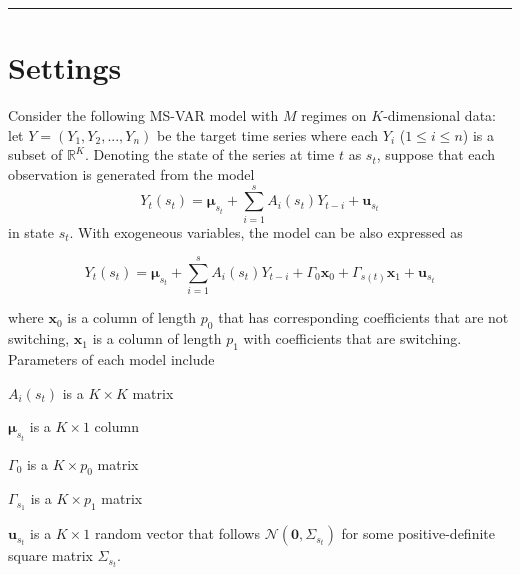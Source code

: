 \documentclass[11pt]{article}
\newcommand{\R}{\mathbb{R}}
\newcommand{\vmu}{\boldsymbol \mu}
\newcommand{\vu}{\mathbf u}
\newcommand{\vx}{\mathbf x}
\newcommand{\vzero}{\mathbf 0}
\begin{document}
  
\noindent\rule{\textwidth}{.1mm}

\section{Settings}
Consider the following MS-VAR model with $M$ regimes on $K$-dimensional data: let $Y = (Y_1, Y_2, ..., Y_n)$ be the target time series where each $Y_i$ ($1 \leq i \leq n$) is a subset of $\R^K$. Denoting the state of the series at time $t$ as $s_t$, suppose that each observation is generated from the model
\begin{equation*}
Y_t (s_t) = \vmu_{s_t} + \sum_{i=1}^{s} A_{i} (s_t) Y_{t - i} + \vu_{s_t}
\end{equation*}
in state $s_t$. With exogeneous variables, the model can be also expressed as 

\begin{equation*}
Y_t (s_t) = \vmu_{s_t} + \sum_{i=1}^{s} A_{i} (s_t) Y_{t - i} + \Gamma_0 \vx_0 + \Gamma_{s(t)} \vx_1 + \vu_{s_t}
\end{equation*}

where $\vx_0$ is a column of length $p_0$ that has corresponding coefficients that are not switching, $\vx_1$ is a column of length $p_1$ with coefficients that are switching. Parameters of each model include

$A_i(s_t)$ is a $K \times K$ matrix

$\vmu_{s_t}$ is a $K \times 1$ column

$\Gamma_0$ is a $K \times p_0$ matrix

$\Gamma_{s_1}$ is a $K \times p_1$ matrix

$\vu_{s_t}$ is a $K \times 1$ random vector that follows $\mathcal{N}(\vzero, \Sigma_{s_t})$ for some positive-definite square matrix $\Sigma_{s_t}$.
\end{document}
